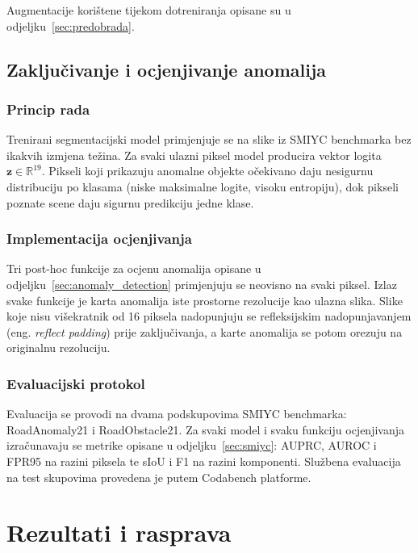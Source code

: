 \documentclass[diplomskirad]{fer}
\begin{document}
Augmentacije korištene tijekom dotreniranja opisane su u 
odjeljku~\ref{sec:predobrada}.


\section{Zaključivanje i ocjenjivanje anomalija}
\label{sec:anomaly_metoda}

\subsection{Princip rada}

Trenirani segmentacijski model primjenjuje se na slike iz SMIYC 
benchmarka bez ikakvih izmjena težina. Za svaki ulazni piksel model 
producira vektor logita $\mathbf{z} \in \mathbb{R}^{19}$. Pikseli 
koji prikazuju anomalne objekte očekivano daju nesigurnu distribuciju 
po klasama (niske maksimalne logite, visoku entropiju), dok pikseli 
poznate scene daju sigurnu predikciju jedne klase.

\subsection{Implementacija ocjenjivanja}

Tri post-hoc funkcije za ocjenu anomalija opisane u 
odjeljku~\ref{sec:anomaly_detection} primjenjuju se neovisno na 
svaki piksel. Izlaz svake funkcije je karta anomalija iste prostorne 
rezolucije kao ulazna slika. Slike koje nisu višekratnik od 16 
piksela nadopunjuju se refleksijskim nadopunjavanjem (eng. 
\textit{reflect padding}) prije zaključivanja, a karte anomalija 
se potom orezuju na originalnu rezoluciju.

\subsection{Evaluacijski protokol}

Evaluacija se provodi na dvama podskupovima SMIYC benchmarka: 
RoadAnomaly21 i RoadObstacle21. Za svaki model i svaku funkciju 
ocjenjivanja izračunavaju se metrike opisane u 
odjeljku~\ref{sec:smiyc}: AUPRC, AUROC i FPR95 na razini piksela 
te sIoU i F1 na razini komponenti. Službena evaluacija na test 
skupovima provedena je putem Codabench platforme.




\chapter{Rezultati i rasprava}
\label{pog:rezultati_i_rasprava}
\end{document}
